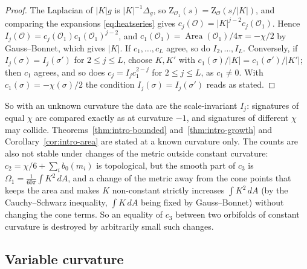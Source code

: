 \documentclass[pdflatex,sn-mathphys-num]{sn-jnl}
\theoremstyle{thmstyleone}%
\theoremstyle{thmstylethree}%
\newcommand{\Orb}{\mathcal{O}}
\newcommand{\Area}{\operatorname{Area}}
\newcommand{\cZ}{\mathrm{Z}}
\begin{document}
\begin{proof}
The Laplacian of $|K|g$ is $|K|^{-1}\Delta_g$, so $\cZ_{\Orb_1}(s)=\cZ_\Orb(s/|K|)$, and comparing the expansions \eqref{eq:heatseries} gives $c_j(\Orb)=|K|^{j-2}c_j(\Orb_1)$. Hence $I_j(\Orb)=c_j(\Orb_1)c_1(\Orb_1)^{j-2}$, and $c_1(\Orb_1)=\Area(\Orb_1)/4\pi=-\chi/2$ by Gauss--Bonnet, which gives $|K|$. If $c_1,\dots,c_L$ agree, so do $I_2,\dots,I_L$. Conversely, if $I_j(\sigma)=I_j(\sigma')$ for $2\le j\le L$, choose $K,K'$ with $c_1(\sigma)/|K|=c_1(\sigma')/|K'|$; then $c_1$ agrees, and so does $c_j=I_jc_1^{2-j}$ for $2\le j\le L$, as $c_1\ne0$. With $c_1(\sigma)=-\chi(\sigma)/2$ the condition $I_j(\sigma)=I_j(\sigma')$ reads as stated.
\end{proof}

So with an unknown curvature the data are the scale-invariant $I_j$: signatures of equal $\chi$ are compared exactly as at curvature $-1$, and signatures of different $\chi$ may collide. Theorems~\ref{thm:intro-bounded} and~\ref{thm:intro-growth} and Corollary~\ref{cor:intro-area} are stated at a known curvature only. The counts are also not stable under changes of the metric outside constant curvature: $c_2=\chi/6+\sum_ib_0(m_i)$ is topological, but the smooth part of $c_3$ is $\Omega_1=\frac1{60\pi}\int K^2\,dA$, and a change of the metric away from the cone points that keeps the area and makes $K$ non-constant strictly increases $\int K^2\,dA$ (by the Cauchy--Schwarz inequality, $\int K\,dA$ being fixed by Gauss--Bonnet) without changing the cone terms. So an equality of $c_3$ between two orbifolds of constant curvature is destroyed by arbitrarily small such changes.

\subsection{Variable curvature}\label{sec:varcurv}
\end{document}
